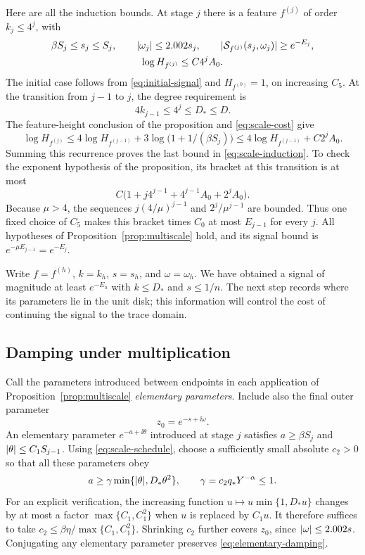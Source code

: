 Here are all the induction bounds.  At stage $j$ there is a feature
$f^{(j)}$ of order $k_j\le4^j$, with
\begin{equation}
 \begin{gathered}
 \beta S_j\le s_j\le S_j,
 \qquad \lvert \omega_j\rvert\le2.002s_j,
 \qquad \lvert \mathcal S_{f^{(j)}}(s_j,\omega_j)\rvert\ge e^{-E_j},\\
 \log H_{f^{(j)}}\le C4^jA_0.
 \end{gathered}
 \label{eq:scale-induction}
\end{equation}
The initial case follows from \eqref{eq:initial-signal} and
$H_{f^{(0)}}=1$, on increasing $C_5$.  At the transition from $j-1$ to
$j$, the degree requirement is
\[
 4k_{j-1}\le4^j\le D_*\le D.
\]
The feature-height conclusion of the proposition and
\eqref{eq:scale-cost} give
\[
 \log H_{f^{(j)}}
 \le4\log H_{f^{(j-1)}}
       +3\log\bigl(1+1/(\beta S_j)\bigr)
 \le4\log H_{f^{(j-1)}}+C2^jA_0.
\]
Summing this recurrence proves the last bound in
\eqref{eq:scale-induction}.  To check the exponent hypothesis of the
proposition, its bracket at this transition is at most
\[
 C\bigl(1+j4^{j-1}+4^{j-1}A_0+2^jA_0\bigr).
\]
Because $\mu>4$, the sequences
$j(4/\mu)^{j-1}$ and $2^j/\mu^{j-1}$ are bounded.  Thus one fixed
choice of $C_5$ makes this bracket times $C_0$ at most $E_{j-1}$ for
every $j$.  All hypotheses of Proposition~\ref{prop:multiscale} hold,
and its signal bound is $e^{-\mu E_{j-1}}=e^{-E_j}$.

Write $f=f^{(h)}$, $k=k_h$, $s=s_h$, and $\omega=\omega_h$.
We have obtained a signal of magnitude at least $e^{-E_h}$ with
$k\le D_*$ and $s\le1/n$.  The next step records where its parameters
lie in the unit disk; this information will control the cost of
continuing the signal to the trace domain.

\subsection{Damping under multiplication}

Call the parameters introduced between endpoints in each application of
Proposition~\ref{prop:multiscale} \emph{elementary parameters}.  Include
also the final outer parameter
\[
 z_0=e^{-s+\ii\omega}.
\]
An elementary parameter $e^{-a+\ii\theta}$ introduced at stage $j$
satisfies $a\ge\beta S_j$ and $\lvert \theta\rvert\le C_1S_{j-1}$.
Using \eqref{eq:scale-schedule}, choose a sufficiently small absolute
$c_2>0$ so that all these parameters obey
\begin{equation}
 a\ge\gamma\min\{\lvert \theta\rvert,D_*\theta^2\},
 \qquad \gamma=c_2q_*Y^{-\alpha}\le1.
 \label{eq:elementary-damping}
\end{equation}
For an explicit verification, the increasing function
$u\mapsto u\min\{1,D_*u\}$ changes by at most a factor
$\max\{C_1,C_1^2\}$ when $u$ is replaced by $C_1u$.
It therefore suffices to take
$c_2\le\beta\eta/\max\{C_1,C_1^2\}$.
Shrinking $c_2$ further covers $z_0$, since
$\lvert \omega\rvert\le2.002s$.  Conjugating any elementary parameter
preserves \eqref{eq:elementary-damping}.

